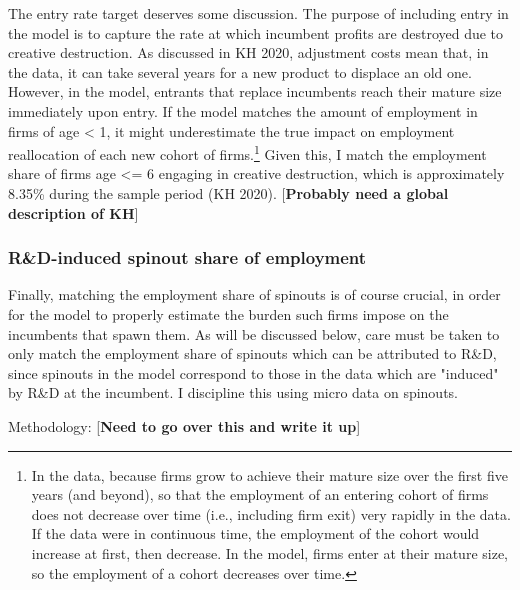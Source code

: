 \documentclass[11pt,english]{article}
\theoremstyle{remark}
\begin{document}
The entry rate target deserves some discussion. The purpose of including entry in the model is to capture the rate at which incumbent profits are destroyed due to creative destruction. As discussed in KH 2020, adjustment costs mean that, in the data, it can take several years for a new product to displace an old one. However, in the model, entrants that replace incumbents reach their mature size immediately upon entry. If the model matches the amount of employment in firms of age < 1, it might underestimate the true impact on employment reallocation of each new cohort of firms.\footnote{In the data, because firms grow to achieve their mature size over the first five years (and beyond), so that the employment of an entering cohort of firms does not decrease over time (i.e., including firm exit) very rapidly in the data. If the data were in continuous time, the employment of the cohort would increase at first, then decrease. In the model, firms enter at their mature size, so the employment of a cohort decreases over time.} Given this, I match the employment share of firms age <= 6 engaging in creative destruction, which is approximately 8.35\% during the sample period (KH 2020). [\textbf{Probably need a global description of KH}]
 
\subsubsection{R\&D-induced spinout share of employment}

Finally, matching the employment share of spinouts is of course crucial, in order for the model to properly estimate the burden such firms impose on the incumbents that spawn them. As will be discussed below, care must be taken to only match the employment share of spinouts which can be attributed to R\&D, since spinouts in the model correspond to those in the data which are "induced" by R\&D at the incumbent. I discipline this using micro data on spinouts.

Methodology: [\textbf{Need to go over this and write it up}]
\end{document}
